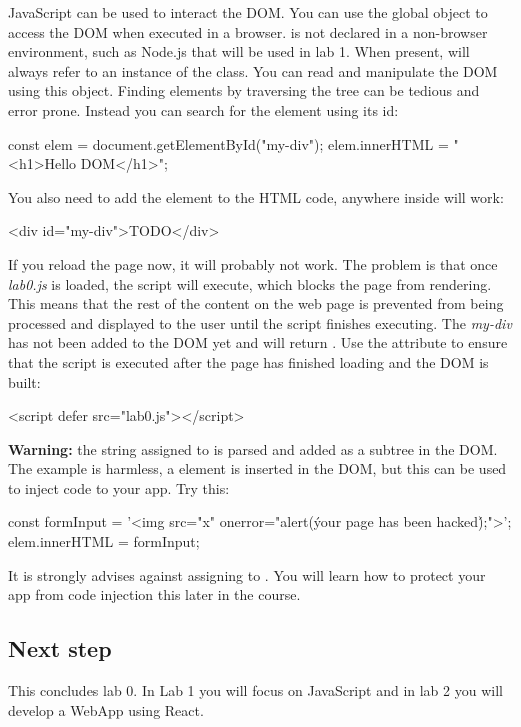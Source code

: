 \documentclass[fleqn, article, a4paper]{memoir}
\begin{document}
JavaScript can be used to interact the DOM. You can use the global object  to access the DOM when executed in a browser.  is not declared in a non-browser environment, such as Node.js that will be used in lab 1. When present,  will always refer to an instance of the  class. You can read and manipulate the DOM using this object. Finding elements by traversing the tree can be tedious and error prone. Instead you can search for the element using its id:
\begin{Code}
const elem = document.getElementById("my-div");
elem.innerHTML = "<h1>Hello DOM</h1>";
\end{Code}
You also need to add the element to the HTML code, anywhere inside  will work:
\begin{Code}
<div id="my-div">TODO</div>
\end{Code}
If you reload the page now, it will probably not work. The problem is that once \emph{lab0.js} is loaded, the script will execute, which blocks the page from rendering. This means that the rest of the content on the web page is prevented from being processed and displayed to the user until the script finishes executing. The \emph{my-div} has not been added to the DOM yet and  will return . Use the  attribute to ensure that the script is executed after the page has finished loading and the DOM is built:
\begin{Code}
<script defer src="lab0.js"></script>
\end{Code}
\textbf{Warning:} the string assigned to  is parsed and added as a subtree in the DOM. The example is harmless, a  element is inserted in the DOM, but this can be used to inject code to your app. Try this:
\begin{Code}
const formInput = '<img src="x" onerror="alert(\'your page has been hacked\');">';
elem.innerHTML = formInput;
\end{Code}
It is strongly advises against assigning to . You will learn how to protect your app from code injection this later in the course.

\subsection*{Next step}
\noindent This concludes lab 0. In Lab 1 you will focus on JavaScript and in lab 2 you will develop a WebApp using React.


\end{document}
